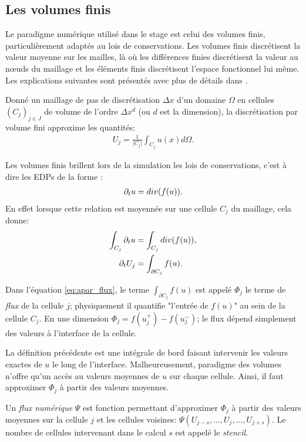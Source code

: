\subsection{Les volumes finis}
    Le paradigme numérique utilisé dans le stage est celui des volumes finis, particulièrement adaptés au lois de conservations.
    Les volumes finis discrétisent la valeur moyenne sur les mailles, là où les différences finies discrétisent la valeur au nœuds du maillage et 
    les éléments finis discrétisent l'espace fonctionnel lui même. Les explications suivantes sont présentés avec plus de détails dans \cite{LeVeque1990}.
    \begin{definition}
        Donné un maillage de pas de discrétisation $\Delta x$ d'un domaine $\Omega$ en cellules $(C_j)_{j\in J}$ de volume de l'ordre $\Delta x^d$ (ou $d$ est la dimension), 
        la discrétisation par volume fini approxime les quantités:
        \begin{align}
            U_j = \frac{1}{\vert C_j \vert} \int_{C_j} u(x) d\Omega.
        \end{align}
    \end{definition}
    Les volumes finis brillent lors de la simulation les lois de conservations, c'est à dire les EDPs de la forme :
    \begin{align}
        \partial_t u = div(f(u)).
    \end{align}
    En effet lorsque cette relation est moyennée sur une cellule $C_j$ du maillage, cela donne: 
    \begin{align}
        \int_{C_j} \partial_t u&= \int_{C_j}  div(f(u)),\\
        \partial_t U_j &= \int_{\partial C_j} f(u).\label{eq:apar_flux}
    \end{align}
    \begin{definition}
        Dans l'équation \ref{eq:apar_flux}, le terme $\int_{\partial C_j} f(u)$ est appelé $\Phi_j$ le terme de \textit{flux} de la cellule $j$;
        physiquement il quantifie "l'entrée de $f(u)$" au sein de la cellule $C_j$. En une dimension $\Phi_j = f(u^+_j) - f(u^-_j)$;
        le flux dépend simplement des valeurs à l'interface de la cellule.
    \end{definition}
    La définition précédente est une intégrale de bord faisant intervenir les valeurs exactes de $u$ le long de l'interface.
    Malheureusement, paradigme des volumes n'offre qu'un accès au valeurs moyennes de $u$ sur chaque cellule.
    Ainsi, il faut approximer $\Phi_j$ à partir des valeurs moyennes.
    \begin{definition}
        Un \textit{flux numérique} $\Psi$ est fonction permettant d’approximer $\Phi_j$ à partir des valeurs moyennes sur la cellule $j$ et les cellules voisines:
        $\Psi(U_{j-s} , \ldots , U_j ,\ldots , U_{j+s})$. Le nombre de cellules intervenant dans le calcul $s$ est appelé le \textit{stencil}.
    \end{definition}

